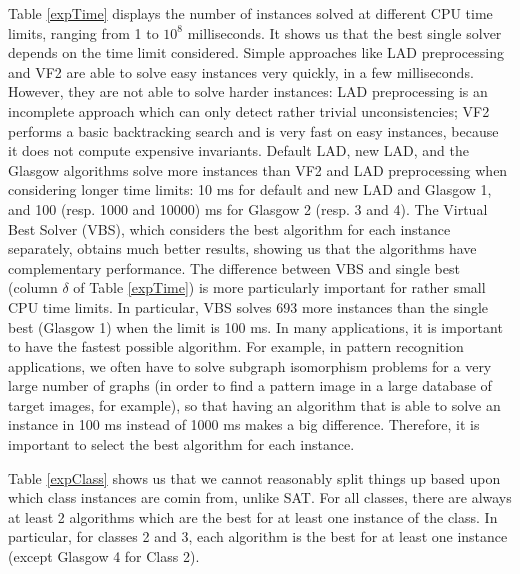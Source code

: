 \documentclass{llncs}
\begin{document}
Table \ref{expTime} displays the number of instances solved at different CPU time limits, ranging
from 1 to $10^8$ milliseconds. It shows us that the best single solver depends on the time limit
considered. Simple approaches like LAD preprocessing and VF2 are able to solve easy instances very
quickly, in a few milliseconds. However, they are not able to solve harder instances: LAD
preprocessing is an incomplete approach which can only detect rather trivial unconsistencies; VF2
performs a basic backtracking search and is very fast on easy instances, because it does not compute
expensive invariants. Default LAD, new LAD, and the Glasgow algorithms solve more instances than VF2
and LAD preprocessing when considering longer time limits: 10 ms for default and new LAD and Glasgow
1, and 100 (resp. 1000 and 10000) ms for Glasgow 2 (resp. 3 and 4). The Virtual Best Solver (VBS),
which considers the best algorithm for each instance separately, obtains much better results,
showing us that the algorithms have complementary performance. The difference between VBS and single
best (column $\delta$ of Table \ref{expTime}) is more particularly important for rather small CPU
time limits. In particular, VBS solves 693 more instances than the single best (Glasgow 1) when the
limit is 100 ms. In many applications, it is important to have the fastest possible algorithm. For
example, in pattern recognition applications, we often have to solve subgraph isomorphism problems
for a very large number of graphs (in order to find a pattern image in a large database of target
images, for example), so that having an algorithm that is able to solve an instance in 100 ms
instead of 1000 ms makes a big difference. Therefore, it is important to select the best algorithm
for each instance.

Table \ref{expClass} shows us that we cannot reasonably split things up based upon which class
instances are comin from, unlike SAT. For all classes, there are always at least 2 algorithms which
are the best for at least one instance of the class. In particular, for classes 2 and 3, each
algorithm is the best for at least one instance (except Glasgow 4 for Class 2).
\end{document}
